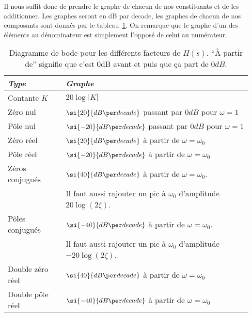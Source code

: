 Il nous suffit donc de prendre le graphe de chacun de nos constituants
et de les additionner.
Les graphes seront en dB par decade, les graphes de chacun de nos
composants sont donnés par le tableau~\ref{tab:bode}.
On remarque que le graphe d'un des éléments au dénominateur est simplement
l'opposé de celui au numérateur.
\begin{table}
  \centering
  \begin{tabular}{|l|l|}
    \hline
    \emph{Type} & \emph{Graphe}\\
    \hline
    Contante $K$ & $20\log|K|$\\
    \hline
    Zéro nul & $\si{20}{dB\per decade}$ passant par $\si{0}{dB}$ pour
    $\omega=1$\\
    \hline
    Pôle nul & $\si{-20}{dB\per decade}$ passant par $\si{0}{dB}$ pour
    $\omega=1$\\
    \hline
    Zéro réel & $\si{20}{dB\per decade}$ à partir de $\omega = \omega_0$\\
    \hline
    Pôle réel & $\si{-20}{dB\per decade}$ à partir de $\omega = \omega_0$\\
    \hline
    Zéros conjugués &
    $\si{40}{dB\per decade}$ à partir de $\omega = \omega_0$.\\
    & Il faut aussi rajouter un pic à $\omega_0$ d'amplitude
    $20\log(2\zeta)$.\\
    \hline
    Pôles conjugués &
    $\si{-40}{dB\per decade}$ à partir de $\omega = \omega_0$.\\
    &
    Il faut aussi rajouter un pic à $\omega_0$ d'amplitude
    $-20\log(2\zeta)$.\\
    \hline
    Double zéro réel &
    $\si{40}{dB\per decade}$ à partir de $\omega = \omega_0$\\
    \hline
    Double pôle réel &
    $\si{-40}{dB\per decade}$ à partir de $\omega = \omega_0$\\
    \hline
  \end{tabular}
  \caption{Diagramme de bode pour les différents facteurs de $H(s)$.
  ``À partir de'' signifie que c'est \si{0}{dB} avant et puis
  que ça part de $\si{0}{dB}$.}
  \label{tab:bode}
\end{table}

